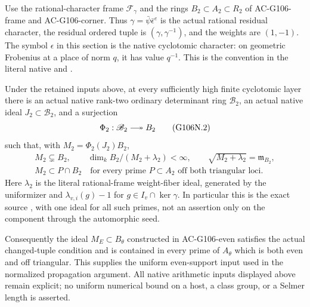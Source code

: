 Use the rational-character frame \(\mathcal F_\gamma\)
and the rings \(B_2\subset A_2\subset R_2\) of
AC-G106-frame and AC-G106-corner. Thus
\(\gamma=\bar\psi\bar\epsilon^e\) is the actual rational
residual character, the residual ordered tuple is
\((\gamma,\gamma^{-1})\), and the weights are \((1,-1)\).
The symbol \(\epsilon\) in this section is the native
cyclotomic character: on geometric Frobenius at a place of
norm \(q\), it has value \(q^{-1}\). This is the convention
in the literal native  and
.

\begin{theorem}
\label{AC-G106-native}
Under the retained inputs above, at every sufficiently high
finite cyclotomic layer there is an actual native rank-two
ordinary determinant ring \(\mathscr B_2\), an actual native
ideal \(J_2\subset\mathscr B_2\), and a surjection
\[
             \Phi_2:\mathscr B_2\longtwoheadrightarrow B_2
\tag{G106N.2}
\]
such that, with \(M_2=\Phi_2(J_2)B_2\),
\[
 \begin{gathered}
 M_2\subsetneq B_2,\qquad
 \dim_k B_2/(M_2+\lambda_2)<\infty,\qquad
 \sqrt{M_2+\lambda_2}=\mathfrak m_{B_2},\\
 M_2\subset P\cap B_2
 \quad\text{for every prime }P\subset A_2
                         \text{ off both triangular loci}.
 \end{gathered}
\tag{G106N.3}
\]
Here \(\lambda_2\) is the literal rational-frame weight-fiber
ideal, generated by the uniformizer and
\(\lambda_{v,i}(g)-1\) for
\(g\in I_v\cap\ker\gamma\). In particular this is
the exact source , with one ideal for all such
primes, not an assertion only on the component through the
automorphic seed.

Consequently the ideal \(M_E\subset B_\theta\) constructed
in AC-G106-even satisfies the actual changed-tuple
 condition and is contained in every prime of
\(A_\theta\) which is both even and off triangular.
This supplies the uniform even-support input used in the
normalized propagation argument. All native arithmetic
inputs displayed above remain explicit; no uniform numerical
bound on a host, a class group, or a Selmer length is asserted.
\end{theorem}

